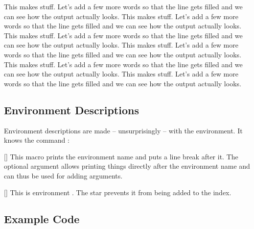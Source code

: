 \documentclass[load-preamble]{cnltx-doc}
\begin{document}
\begin{example}
  \begin{options}
      This makes stuff.  Let's add a few more words so that the line gets
      filled and we can see how the output actually looks.
      This makes stuff.  Let's add a few more words so that the line gets
      filled and we can see how the output actually looks.
    \Default
      This makes stuff.  Let's add a few more words so that the line gets
      filled and we can see how the output actually looks.
      This makes stuff.  Let's add a few more words so that the line gets
      filled and we can see how the output actually looks.
      This makes stuff.  Let's add a few more words so that the line gets
      filled and we can see how the output actually looks.
      This makes stuff.  Let's add a few more words so that the line gets
      filled and we can see how the output actually looks.
  \end{options}
\end{example}

\subsection{Environment Descriptions}\label{sec:usage:environments}

Environment descriptions are made -- unsurprisingly -- with the
 environment.  It knows the command :

\begin{commands}
  [\sarg{}]
    This macro prints the environment name and puts a line break
    after it.  The optional argument allows printing things directly after the
    environment name and can thus be used for adding arguments.
\end{commands}

\begin{example}
  \begin{environments}
    []
      This is environment .  The star prevents it from being
      added to the index.
  \end{environments}
\end{example}

\subsection{Example Code}\label{sec:usage:examples}
\end{document}
